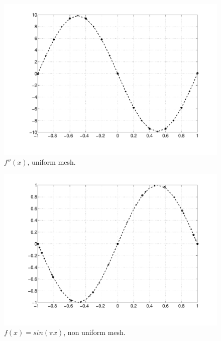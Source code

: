 \begin{landscape}
\begin{multicols}{3}
\columnbreak

\begin{figure}[H]
\centering
\includegraphics[scale=0.3, trim = 20mm 0mm 0mm 0mm, clip]{./Figures/1-HOFD/ddu_u.pdf}
\caption{$f''(x)$, uniform mesh. }
\end{figure}

\end{multicols}

\begin{multicols}{3}

\begin{figure}[H]
\centering
\includegraphics[scale=0.3, trim = 20mm 0mm 0mm 0mm, clip]{./Figures/1-HOFD/u_nonu.pdf}
\caption{$f(x)= sin(\pi x)$, non uniform mesh. }
\end{figure}


\end{multicols}
\end{landscape}
